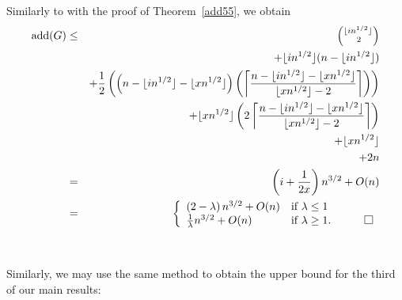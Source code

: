 \documentclass{article}
\newtheorem{Proof of Theorem}{Proof of Theorem}
\begin{document}
Similarly to with the proof of Theorem~\ref{add55}, we obtain
\begin{eqnarray*}
\textrm{add}(G) & \leq & \left( ^{\lfloor in^{1/2} \rfloor}_{\phantom{ww}2} \right) \\
& & + \lfloor in^{1/2} \rfloor (n - \lfloor in^{1/2} \rfloor) \\
& & +\frac{1}{2} \left( \left( n - \lfloor in^{1/2} \rfloor - \lfloor xn^{1/2} \rfloor \right)
\left( \left \lceil 
\frac{n - \lfloor in^{1/2} \rfloor - \lfloor xn^{1/2} \rfloor}{ \lfloor xn^{1/2} \rfloor - 2} 
\right \rceil \right) \right) \\
& & + \lfloor xn^{1/2} \rfloor 
\left( 2 \left \lceil 
\frac{n - \lfloor in^{1/2} \rfloor - \lfloor xn^{1/2} \rfloor}{ \lfloor xn^{1/2} \rfloor - 2} 
\right \rceil \right) \\
& & + \lfloor xn^{1/2} \rfloor \\
& & + 2n \\
& = & \left( i + \frac{1}{2x} \right) n^{3/2} + O(n) \\
& = & 
\left\{ \begin{array}{ll}
\left( 2 - \lambda \right) n^{3/2} + O(n) & \textrm{if } \lambda \leq 1 \\
\frac{1}{ \lambda} n^{3/2} + O(n) & \textrm{if } \lambda \geq 1. 
\phantom{qwerty}
\setlength{\unitlength}{.25cm}
\begin{picture}(1,1)
\put(0,0){\line(1,0){1}}
\put(0,0){\line(0,1){1}}
\put(1,1){\line(-1,0){1}}
\put(1,1){\line(0,-1){1}}
\end{picture} \\
\end{array} \right. 
\end{eqnarray*} \\
\\















Similarly, we may use the same method to obtain the upper bound for the third of our main results: 
\end{document}
